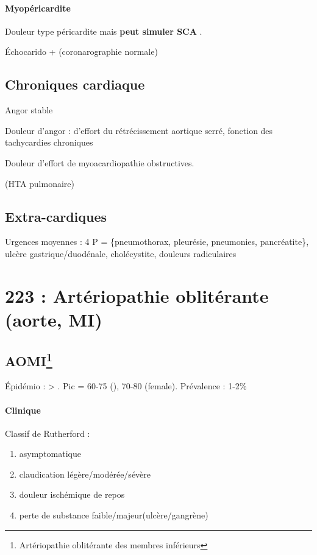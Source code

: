 \paragraph{Myopéricardite}
Douleur type péricardite mais \textbf{peut simuler SCA} .

Échocarido + (coronarographie normale)

\subsection{Chroniques cardiaque}
Angor stable

Douleur d'angor : d'effort du rétrécissement aortique serré, fonction des
tachycardies chroniques

Douleur d'effort de myoacardiopathie obstructives.

(HTA pulmonaire)

\subsection{Extra-cardiques}
Urgences moyennes : 4 P = \{pneumothorax, pleurésie,
pneumonies, pancréatite\}, ulcère gastrique/duodénale, cholécystite, douleurs
radiculaires











\section{223 : Artériopathie oblitérante (aorte, MI)}%
\label{sec:223_arteriopathie_obliterante_aorte_mi_}
\subsection{AOMI\footnote{Artériopathie oblitérante des membres inférieurs}}

Épidémio : \male > \female. Pic = 60-75 (\male), 70-80 (female). Prévalence :
1-2\%

\paragraph{Clinique}
Classif de Rutherford : 
\begin{enumerate}[label=\Roman*]
  \item asymptomatique 
  \item claudication légère/modérée/sévère
  \item douleur ischémique de repos 
  \item perte de substance faible/majeur(ulcère/gangrène)
\end{enumerate}

